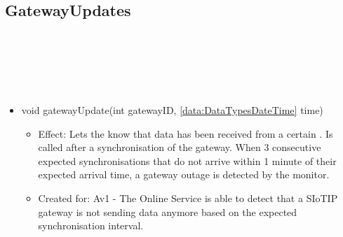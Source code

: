   \subsection{GatewayUpdates}\label{int:OnlineServiceOnlineServiceGatewayBrokerGatewayMonitorGatewayUpdates}
    \begin{description}
      \item[Provided by:] \iconcomponent{}~
      \item[Required by:] \iconcomponent{}~
      \item[Operations:] ~
    \begin{itemize}[noitemsep,nolistsep,leftmargin=-.25cm]
      \item \textsf{void gatewayUpdate(int gatewayID, \ref{data:DataTypesDateTime} time)}
        \begin{itemize}[noitemsep,nolistsep]
           \item Effect: Lets the  know that data has been received from a certain . Is called after a synchronisation of the gateway. When 3 consecutive expected synchronisations that do not arrive within 1 minute of their expected arrival time, a gateway outage is detected by the monitor.
\item Created for: Av1 - The Online Service is able to detect that a SIoTIP gateway is not sending data anymore based on the expected synchronisation interval.
        \end{itemize}
    \end{itemize}
    \end{description}

